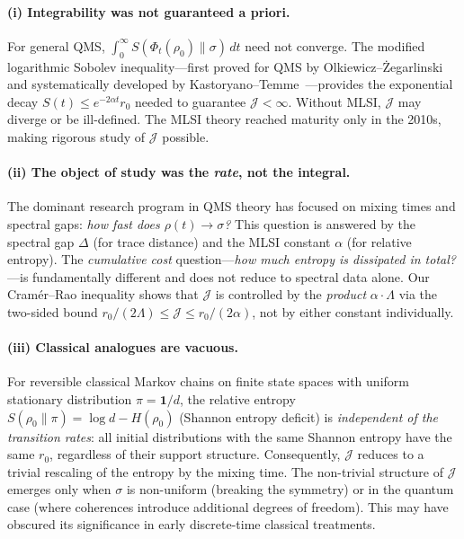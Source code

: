 \documentclass[11pt,a4paper]{article}
\theoremstyle{definition}
\theoremstyle{remark}
\begin{document}
\paragraph{(i) Integrability was not guaranteed a priori.}
For general QMS, $\int_0^\infty S(\Phi_t(\rho_0)\|\sigma)\,dt$ need not converge.
The modified logarithmic Sobolev inequality—first proved for QMS by 
Olkiewicz--Żegarlinski~\cite{OlkiewiczZegarlinski1999} and systematically 
developed by Kastoryano--Temme~\cite{KastoryanoTemme2013}—provides the 
exponential decay $S(t) \le e^{-2\alpha t}r_0$ needed to guarantee 
$\mathcal{J} < \infty$. Without MLSI, $\mathcal{J}$ may diverge or be 
ill-defined. The MLSI theory reached maturity only in the 2010s, making 
rigorous study of $\mathcal{J}$ possible.

\paragraph{(ii) The object of study was the \emph{rate}, not the integral.}
The dominant research program in QMS theory has focused on mixing times 
and spectral gaps: \emph{how fast does $\rho(t) \to \sigma$?} 
This question is answered by the spectral gap $\Delta$ (for trace distance) 
and the MLSI constant $\alpha$ (for relative entropy). The \emph{cumulative 
cost} question—\emph{how much entropy is dissipated in total?}—is 
fundamentally different and does not reduce to spectral data alone. 
Our Cram\'er--Rao inequality shows that $\mathcal{J}$ is controlled by 
the \emph{product} $\alpha \cdot \Lambda$ via the two-sided bound 
$r_0/(2\Lambda) \le \mathcal{J} \le r_0/(2\alpha)$, not by either constant 
individually.

\paragraph{(iii) Classical analogues are vacuous.}
For reversible classical Markov chains on finite state spaces with uniform 
stationary distribution $\pi = \mathbf{1}/d$, the relative entropy 
$S(\rho_0\|\pi) = \log d - H(\rho_0)$ (Shannon entropy deficit) is 
\emph{independent of the transition rates}: all initial distributions with 
the same Shannon entropy have the same $r_0$, regardless of their support 
structure. Consequently, $\mathcal{J}$ reduces to a trivial rescaling of 
the entropy by the mixing time. The non-trivial structure of $\mathcal{J}$ 
emerges only when $\sigma$ is non-uniform (breaking the symmetry) or in 
the quantum case (where coherences introduce additional degrees of freedom). 
This may have obscured its significance in early discrete-time classical 
treatments.
\end{document}
